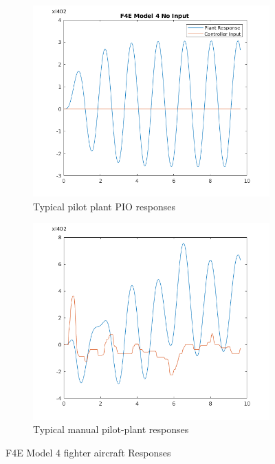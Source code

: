 \documentclass{article}
\begin{document}
\begin{figure}[htp]
\centering
\begin{subfigure}{.5\textwidth}
  \centering
  \includegraphics[width=0.9\linewidth]{2_3_F4E_Model_4_No_Input.png}
	\caption{Typical pilot plant PIO responses}
	\label{fig:f4e_no_input}
\end{subfigure}%
\begin{subfigure}{.5\textwidth}
  \centering
  \includegraphics[width=0.9\linewidth]{2_3_F4E_Model_4_Manual_Control.png}
  \caption{Typical manual pilot-plant responses}
  \label{fig:f4e_response}
\end{subfigure}
\caption{F4E Model 4 fighter aircraft Responses}
\end{figure}
\end{document}
